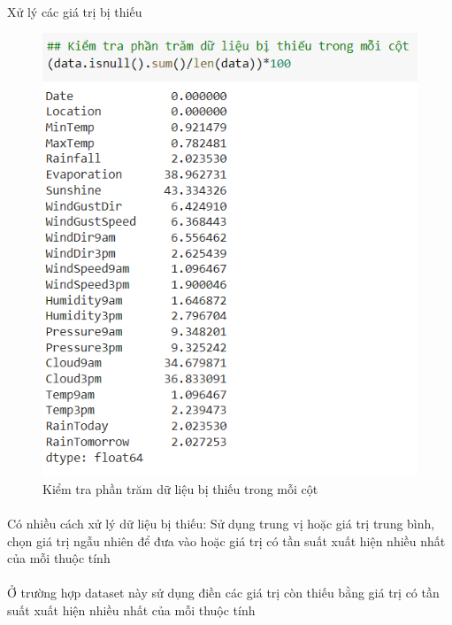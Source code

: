\documentclass{article}
\begin{document}
\paragraph{}Xử lý các giá trị bị thiếu
\begin{figure}[!h]
	\begin{center}
		\includegraphics[width=\linewidth]{images/code14.png}
		\caption{\fontsize{14}{20}\selectfont Kiểm tra phần trăm dữ liệu bị thiếu trong mỗi cột}
	\end{center}
\end{figure}
\pagebreak
\paragraph{}Có nhiều cách xử lý dữ liệu bị thiếu: Sử dụng trung vị hoặc giá trị trung bình, chọn giá trị ngẫu nhiên để đưa vào hoặc giá trị có tần suất xuất hiện nhiều nhất của mỗi thuộc tính
\paragraph{}Ở trường hợp dataset này sử dụng điền các giá trị còn thiếu bằng giá trị có tần suất xuất hiện nhiều nhất của mỗi thuộc tính
\end{document}
